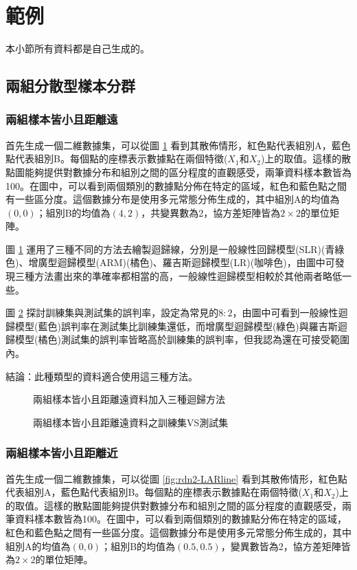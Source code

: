 \section{範例}
本小節所有資料都是自己生成的。
\subsection{兩組分散型樣本分群}
\subsubsection{兩組樣本皆小且距離遠}
首先生成一個二維數據集，可以從圖 \ref{fig:rdn1-LARline} 看到其散佈情形，紅色點代表組別A，藍色點代表組別B。每個點的座標表示數據點在兩個特徵($X_1$和$X_2$)上的取值。這樣的散點圖能夠提供對數據分布和組別之間的區分程度的直觀感受，兩筆資料樣本數皆為100。在圖中，可以看到兩個類別的數據點分佈在特定的區域，紅色和藍色點之間有一些區分度。這個數據分布是使用多元常態分佈生成的，其中組別A的均值為$(0, 0)$；組別B的均值為$(4, 2)$，共變異數為2，協方差矩陣皆為$2 \times 2$的單位矩陣。

圖 \ref{fig:rdn1-LARline} 運用了三種不同的方法去繪製迴歸線，分別是一般線性回歸模型(SLR)(青綠色)、增廣型迴歸模型(ARM)(橘色)、羅吉斯迴歸模型(LR)(咖啡色)，由圖中可發現三種方法畫出來的準確率都相當的高，一般線性迴歸模型相較於其他兩者略低一些。

圖 \ref{fig:rdn1-LARline2} 探討訓練集與測試集的誤判率，設定為常見的$8:2$，由圖中可看到一般線性迴歸模型(藍色)誤判率在測試集比訓練集還低，而增廣型迴歸模型(綠色)與羅吉斯迴歸模型(橘色)測試集的誤判率皆略高於訓練集的誤判率，但我認為還在可接受範圍內。

結論：此種類型的資料適合使用這三種方法。
\begin{figure}[H]
    \caption{兩組樣本皆小且距離遠資料加入三種迴歸方法}
    \label{fig:rdn1-LARline}
\end{figure}


\begin{figure}[H]
    \caption{兩組樣本皆小且距離遠資料之訓練集VS測試集}
    \label{fig:rdn1-LARline2}
\end{figure}

\subsubsection{兩組樣本皆小且距離近}
首先生成一個二維數據集，可以從圖 \ref{fig:rdn2-LARline} 看到其散佈情形，紅色點代表組別A，藍色點代表組別B。每個點的座標表示數據點在兩個特徵($X_1$和$X_2$)上的取值。這樣的散點圖能夠提供對數據分布和組別之間的區分程度的直觀感受，兩筆資料樣本數皆為100。在圖中，可以看到兩個類別的數據點分佈在特定的區域，紅色和藍色點之間有一些區分度。這個數據分布是使用多元常態分佈生成的，其中組別A的均值為$(0, 0)$；組別B的均值為$(0.5, 0.5)$，變異數皆為2，協方差矩陣皆為$2 \times 2$的單位矩陣。

